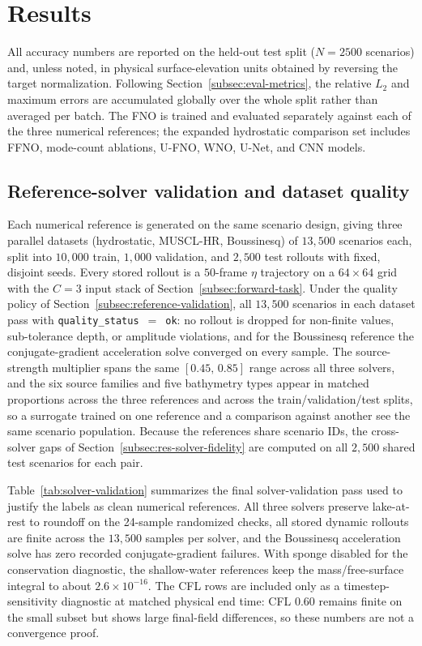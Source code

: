 \section{Results}
\label{sec:results}

All accuracy numbers are reported on the held-out test split ($N = 2500$ scenarios) and, unless noted, in physical surface-elevation units obtained by reversing the target normalization. Following Section~\ref{subsec:eval-metrics}, the relative $L_2$ and maximum errors are accumulated globally over the whole split rather than averaged per batch. The FNO is trained and evaluated separately against each of the three numerical references; the expanded hydrostatic comparison set includes FFNO, mode-count ablations, U-FNO, WNO, U-Net, and CNN models.

\subsection{Reference-solver validation and dataset quality}
\label{subsec:res-dataset}

Each numerical reference is generated on the same scenario design, giving three parallel datasets (hydrostatic, MUSCL-HR, Boussinesq) of $13{,}500$ scenarios each, split into $10{,}000$ train, $1{,}000$ validation, and $2{,}500$ test rollouts with fixed, disjoint seeds. Every stored rollout is a $50$-frame $\eta$ trajectory on a $64\times64$ grid with the $C=3$ input stack of Section~\ref{subsec:forward-task}. Under the quality policy of Section~\ref{subsec:reference-validation}, all $13{,}500$ scenarios in each dataset pass with \texttt{quality\_status}~$=$~\texttt{ok}: no rollout is dropped for non-finite values, sub-tolerance depth, or amplitude violations, and for the Boussinesq reference the conjugate-gradient acceleration solve converged on every sample. The source-strength multiplier spans the same $[0.45,\, 0.85]$ range across all three solvers, and the six source families and five bathymetry types appear in matched proportions across the three references and across the train/validation/test splits, so a surrogate trained on one reference and a comparison against another see the same scenario population. Because the references share scenario IDs, the cross-solver gaps of Section~\ref{subsec:res-solver-fidelity} are computed on all $2{,}500$ shared test scenarios for each pair.

Table~\ref{tab:solver-validation} summarizes the final solver-validation pass used to justify the labels as clean numerical references. All three solvers preserve lake-at-rest to roundoff on the 24-sample randomized checks, all stored dynamic rollouts are finite across the $13{,}500$ samples per solver, and the Boussinesq acceleration solve has zero recorded conjugate-gradient failures. With sponge disabled for the conservation diagnostic, the shallow-water references keep the mass/free-surface integral to about $2.6 \times 10 ^ {-16}$. The CFL rows are included only as a timestep-sensitivity diagnostic at matched physical end time: CFL $0.60$ remains finite on the small subset but shows large final-field differences, so these numbers are not a convergence proof.

